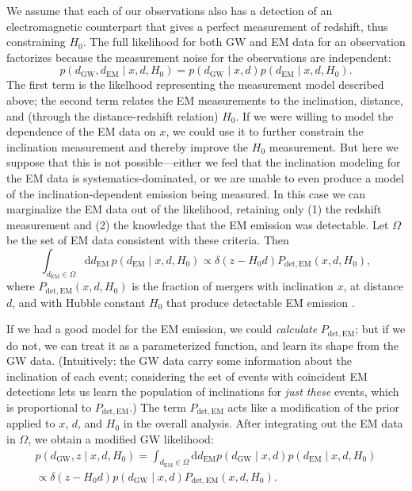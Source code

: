 \documentclass[modern]{aastex631}
\newcommand{\dd}{\mathrm{d}}
\newcommand{\detected}{\mathrm{det}}
\newcommand{\EM}{\mathrm{EM}}
\newcommand{\GW}{\mathrm{GW}}
\begin{document}
We assume that each of our observations also has a detection of an
electromagnetic counterpart that gives a perfect measurement of redshift, thus
constraining $H_0$.  The full likelihood for both GW and EM data for an observation factorizes because the measurement noise for the observations are independent:
\begin{equation}
    p\left( d_\GW, d_\EM \mid x, d, H_0 \right) = p\left( d_\GW \mid x, d \right) p\left( d_\EM \mid x, d, H_0 \right).
\end{equation}
The first term is the likelhood representing the measurement model described
above; the second term relates the EM measurements to the inclination, distance,
and (through the distance-redshift relation) $H_0$.  If we were willing to model
the dependence of the EM data on $x$, we could use it to further constrain the
inclination measurement and thereby improve the $H_0$ measurement.  But here we
suppose that this is not possible---either we feel that the inclination modeling
for the EM data is systematics-dominated, or we are unable to even produce a
model of the inclination-dependent emission being measured.  In this case we can
marginalize the EM data out of the likelihood, retaining only (1) the redshift
measurement and (2) the knowledge that the EM emission was detectable.  Let $\Omega$ be the set of EM data consistent with these criteria.  Then
\begin{equation}
    \int_{d_\EM \in \Omega} \dd d_\EM \, p\left( d_\EM \mid x, d, H_0 \right) \propto \delta\left( z - H_0 d \right) P_\mathrm{det,\EM}\left( x, d, H_0 \right),
\end{equation}
where $P_{\detected,\EM}\left(x, d, H_0\right)$ is the fraction of mergers with
inclination $x$, at distance $d$, and with Hubble constant $H_0$ that produce
detectable EM emission \citep{Mandel2019}.

If we had a good model for the EM emission, we could \emph{calculate}
$P_{\detected,\EM}$; but if we do not, we can treat it as a parameterized
function, and learn its shape from the GW data.  (Intuitively: the GW data carry
some information about the inclination of each event; considering the set of
events with coincident EM detections lets us learn the population of
inclinations for \emph{just these} events, which is proportional to
$P_{\detected,\EM}$.)  The term $P_{\detected,\EM}$ acts like a modification of
the prior applied to $x$, $d$, and $H_0$ in the overall analysis.  After
integrating out the EM data in $\Omega$, we obtain a modified GW likelihood:
\begin{multline}
    p\left( d_\GW, z \mid x, d, H_0 \right) = \int_{d_\EM \in \Omega} \dd d_\EM p\left( d_\GW \mid x, d \right) p\left( d_\EM \mid x, d, H_0 \right) \\ \propto \delta\left( z - H_0 d \right) p\left( d_\GW \mid x, d \right) P_{\detected,\EM}\left( x, d, H_0 \right).
\end{multline}
\end{document}
